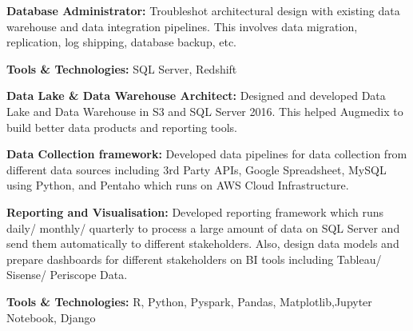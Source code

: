 \documentclass[letterpaper]{deedy-resume} %
\begin{document}
\begin{minipage}[t]{0.66\textwidth}
\sectionspace %


\begin{tightitemize}
\sectionspace
\item \textbf{Database Administrator:}
Troubleshot architectural design with existing data warehouse and data integration pipelines. This involves data migration, replication, log shipping, database backup, etc.
\item \textbf{Tools & Technologies:} SQL Server, Redshift

\end{tightitemize}

\sectionspace %


\begin{tightitemize}
\sectionspace
\item \textbf{Data Lake & Data Warehouse Architect:}
Designed and developed Data Lake and Data Warehouse in S3 and SQL Server 2016. This helped Augmedix to build better data products and reporting tools.

\item \textbf{Data Collection framework:}
Developed data pipelines for data collection from different data sources including 3rd Party APIs, Google Spreadsheet, MySQL using Python, and Pentaho which runs on AWS Cloud Infrastructure.
\item \textbf{Reporting and Visualisation:}
Developed reporting framework which runs daily/ monthly/ quarterly to process a large amount of data on SQL Server and send them automatically to different stakeholders. Also, design data models and prepare dashboards for different stakeholders on BI tools including Tableau/ Sisense/ Periscope Data.
\item \textbf{Tools & Technologies:} R, Python, Pyspark, Pandas, Matplotlib,Jupyter Notebook, Django
\end{tightitemize}

\end{minipage} %


\end{document}
